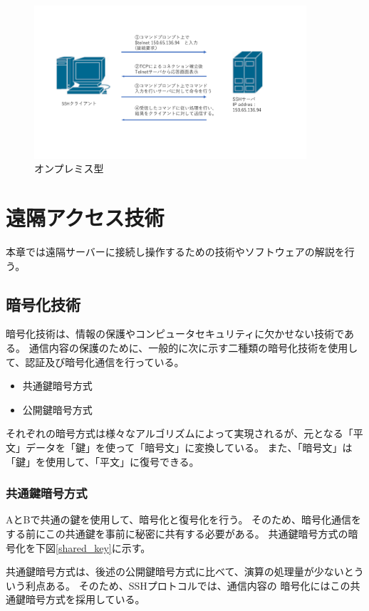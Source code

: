 \documentclass[11pt,a4j,titlepage]{jreport}
\begin{document}
\begin{figure}[h]
    \centering
    \includegraphics*[width=0.9\textwidth,page=15]{graphs/network_archtecture.pdf}
    \caption{オンプレミス型}
    \label{onpremise_graph}
\end{figure}




\chapter{遠隔アクセス技術}
本章では遠隔サーバーに接続し操作するための技術やソフトウェアの解説を行う。

\section{暗号化技術}
暗号化技術は、情報の保護やコンピュータセキュリティに欠かせない技術である。
通信内容の保護のために、一般的に次に示す二種類の暗号化技術を使用して、認証及び暗号化通信を行っている。
\begin{itemize}
    \item 共通鍵暗号方式
    \item 公開鍵暗号方式
\end{itemize}
それぞれの暗号方式は様々なアルゴリズムによって実現されるが、元となる「平文」データを「鍵」を使って「暗号文」に変換している。
また、「暗号文」は「鍵」を使用して、「平文」に復号できる。

\subsection{共通鍵暗号方式}
AとBで共通の鍵を使用して、暗号化と復号化を行う。
そのため、暗号化通信をする前にこの共通鍵を事前に秘密に共有する必要がある。
共通鍵暗号方式の暗号化を下図\ref{shared_key}に示す。

共通鍵暗号方式は、後述の公開鍵暗号方式に比べて、演算の処理量が少ないとういう利点ある。
そのため、SSHプロトコルでは、通信内容の
暗号化にはこの共通鍵暗号方式を採用している。\\
\end{document}
